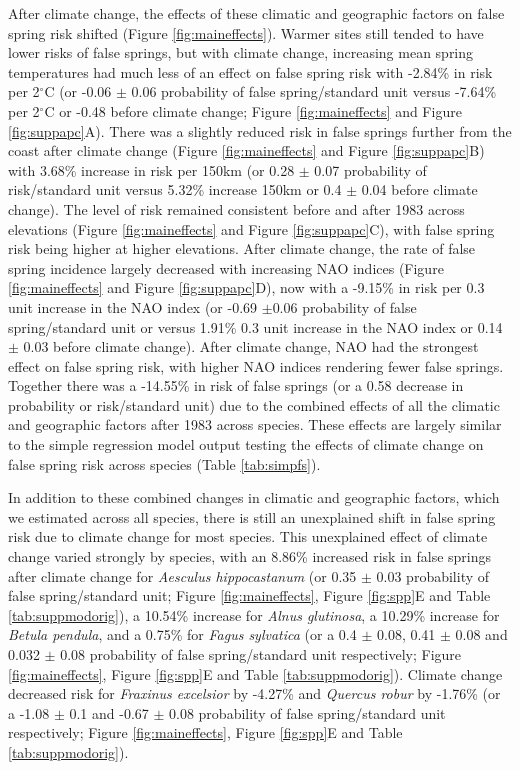 \documentclass{article}\usepackage[]{graphicx}\usepackage[]{color}
\begin{document}
After climate change, the effects of these climatic and geographic factors on false spring risk shifted (Figure \ref{fig:maineffects}). Warmer sites still tended to have lower risks of false springs, but with climate change, increasing mean spring temperatures had much less of an effect on false spring risk with -2.84\% in risk per 2$^{\circ}$C (or -0.06 $\pm$ 0.06 probability of false spring/standard unit versus -7.64\% per 2$^{\circ}$C or -0.48 before climate change; Figure \ref{fig:maineffects} and Figure \ref{fig:suppapc}A). There was a slightly reduced risk in false springs further from the coast after climate change (Figure \ref{fig:maineffects} and Figure \ref{fig:suppapc}B) with 3.68\% increase in risk per 150km (or 0.28 $\pm$ 0.07 probability of risk/standard unit versus 5.32\% increase 150km or 0.4 $\pm$ 0.04 before climate change). The level of risk remained consistent before and after 1983 across elevations (Figure \ref{fig:maineffects} and Figure \ref{fig:suppapc}C), with false spring risk being higher at higher elevations. After climate change, the rate of false spring incidence largely decreased with increasing NAO indices (Figure \ref{fig:maineffects} and Figure \ref{fig:suppapc}D), now with a -9.15\% in risk per 0.3 unit increase in the NAO index (or -0.69 $\pm$0.06 probability of false spring/standard unit or versus 1.91\% 0.3 unit increase in the NAO index or 0.14 $\pm$ 0.03 before climate change). After climate change, NAO had the strongest effect on false spring risk, with higher NAO indices rendering fewer false springs. Together there was a -14.55\% in risk of false springs (or a 0.58 decrease in probability or risk/standard unit) due to the combined effects of all the climatic and geographic factors after 1983 across species. These effects are largely similar to the simple regression model output testing the effects of climate change on false spring risk across species (Table \ref{tab:simpfs}).  %

In addition to these combined changes in climatic and geographic factors, which we estimated across all species, there is still an unexplained shift in false spring risk due to climate change for most species. This unexplained effect of climate change varied strongly by species, with an 8.86\% increased risk in false springs after climate change for \textit{Aesculus hippocastanum} (or 0.35 $\pm$ 0.03 probability of false spring/standard unit; Figure \ref{fig:maineffects}, Figure \ref{fig:spp}E and Table \ref{tab:suppmodorig}), a 10.54\% increase for \textit{Alnus glutinosa}, a 10.29\% increase for \textit{Betula pendula}, and a 0.75\% for \textit{Fagus sylvatica} (or a 0.4 $\pm$ 0.08, 0.41 $\pm$ 0.08 and 0.032 $\pm$ 0.08 probability of false spring/standard unit respectively; Figure \ref{fig:maineffects}, Figure \ref{fig:spp}E and Table \ref{tab:suppmodorig}). Climate change decreased risk for \textit{Fraxinus excelsior} by -4.27\% and \textit{Quercus robur} by -1.76\% (or a -1.08 $\pm$ 0.1 and -0.67 $\pm$ 0.08 probability of false spring/standard unit respectively; Figure \ref{fig:maineffects}, Figure \ref{fig:spp}E and Table \ref{tab:suppmodorig}).
\end{document}

